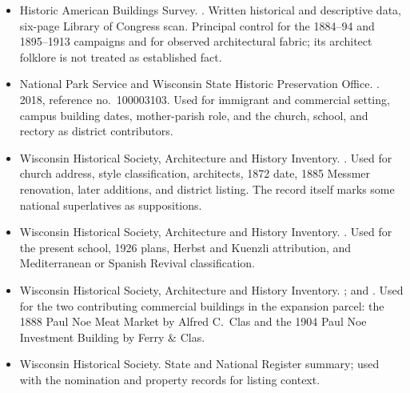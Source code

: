 \begin{itemize}[leftmargin=1.35em,itemsep=0.2em,topsep=0.2em]
\item Historic American Buildings Survey. . Written historical and descriptive data, six-page Library of Congress scan. Principal control for the 1884--94 and 1895--1913 campaigns and for observed architectural fabric; its architect folklore is not treated as established fact.
\item National Park Service and Wisconsin State Historic Preservation Office. . 2018, reference no.~100003103. Used for immigrant and commercial setting, campus building dates, mother-parish role, and the church, school, and rectory as district contributors.
\item Wisconsin Historical Society, Architecture and History Inventory. . Used for church address, style classification, architects, 1872 date, 1885 Messmer renovation, later additions, and district listing. The record itself marks some national superlatives as suppositions.
\item Wisconsin Historical Society, Architecture and History Inventory. . Used for the present school, 1926 plans, Herbst and Kuenzli attribution, and Mediterranean or Spanish Revival classification.
\item Wisconsin Historical Society, Architecture and History Inventory. ; and . Used for the two contributing commercial buildings in the expansion parcel: the 1888 Paul Noe Meat Market by Alfred C.~Clas and the 1904 Paul Noe Investment Building by Ferry \& Clas.
\item Wisconsin Historical Society.  State and National Register summary; used with the nomination and property records for listing context.

\end{itemize}

